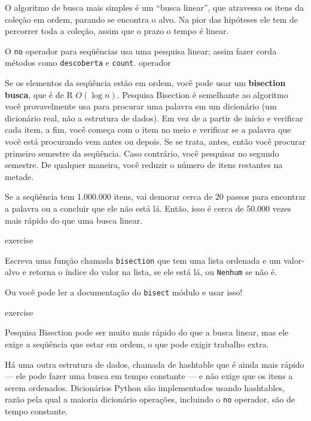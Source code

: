 \documentclass[10pt]{book}
\begin{document}
\begin{exercise}
\begin{v erbatim}
O algoritmo de busca mais simples é um ``busca linear'', que atravessa
os itens da coleção em ordem, parando se encontra o alvo.
Na pior das hipóteses ele tem de percorrer toda a coleção, assim que o prazo
o tempo é linear.

O {\tt no} operador para seqüências usa uma pesquisa linear; assim fazer corda
métodos como {\tt descoberta} e {\tt count}.
 operador

Se os elementos da seqüência estão em ordem, você pode usar um {\bf
  bisection busca}, que é de R $ O (\log n) $. Pesquisa Bisection é
semelhante ao algoritmo você provavelmente usa para procurar uma palavra em um
dicionário (um dicionário real, não a estrutura de dados). Em vez de a partir de
início e verificar cada item, a fim, você começa com o item
no meio e verificar se a palavra que você está procurando vem
antes ou depois. Se se trata, antes, então você procurar primeiro semestre
da seqüência. Caso contrário, você pesquisar no segundo semestre. De qualquer maneira,
você reduzir o número de itens restantes na metade. 

Se a seqüência tem 1.000.000 itens, vai demorar cerca de 20 passos para
encontrar a palavra ou a concluir que ele não está lá. Então, isso é cerca de 50.000
vezes mais rápido do que uma busca linear.

\begin{} exercise

Escreva uma função chamada {\tt bisection} que tem uma lista ordenada
e um valor-alvo e retorna o índice do valor
na lista, se ele está lá, ou {\tt Nenhum} se não é.


Ou você pode ler a documentação do {\tt bisect} módulo
e usar isso!

\end{} exercise

Pesquisa Bisection pode ser muito mais rápido do que a busca linear, mas
ele exige a seqüência que estar em ordem, o que pode exigir
trabalho extra.

Há uma outra estrutura de dados, chamada de {hashtable \bf} que
é ainda mais rápido --- ele pode fazer uma busca em tempo constante --- e
não exige que os itens a serem ordenados. Dicionários Python
são implementados usando hashtables, razão pela qual a maioria dicionário
operações, incluindo o {\tt no} operador, são de tempo constante.



\end{v erbatim}
\end{exercise}
\end{document}
